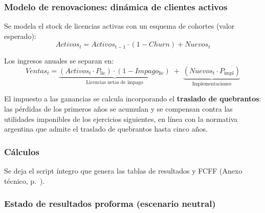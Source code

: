 \subsubsection{Modelo de renovaciones: dinámica de clientes activos}

Se modela el stock de licencias activas con un esquema de cohortes (valor esperado):
\[
Activos_t = Activos_{t-1}\cdot(1-Churn) + Nuevos_t
\]

Los ingresos anuales se separan en:
\[
Ventas_t = \underbrace{\left(Activos_t \cdot P_{\text{lic}}\right)\cdot(1-Impago_{\text{lic}})}_{\text{Licencias netas de impago}} \;+\;
\underbrace{\left(Nuevos_t \cdot P_{\text{impl}}\right)}_{\text{Implementaciones}}
\]

El impuesto a las ganancias se calcula incorporando el \textbf{traslado de quebrantos}: las pérdidas de los primeros años se acumulan y se compensan contra las utilidades imponibles de los ejercicios siguientes, en línea con la normativa argentina que admite el traslado de quebrantos hasta cinco años.

\subsubsection{Cálculos}
Se deja el script íntegro que genera las tablas de resultados y FCFF (Anexo técnico, p.~\pageref{anexo:code-6-5-1-1-1}).

\subsubsection{Estado de resultados proforma (escenario neutral)}

